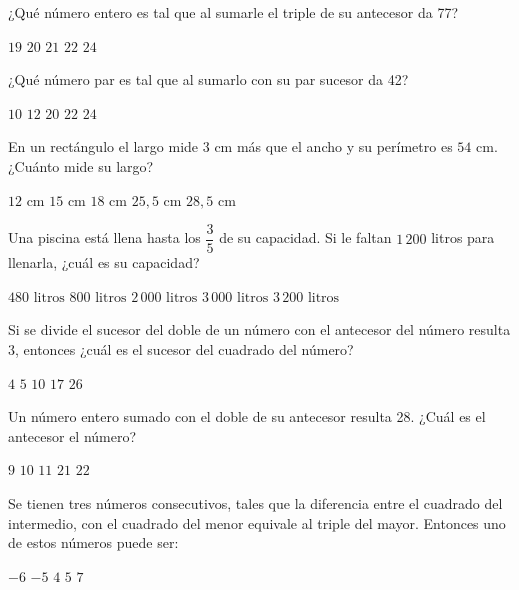 \documentclass[sin nombre]{srs}
\begin{document}
\separador

\begin{preguntas}[after-item-skip=2cm]
\pregunta ¿Qué número entero es tal que al sumarle el triple de su antecesor da 77?
\begin{vertical}
\alternativa $19$
\alternativa $20$
\alternativa $21$
\alternativa $22$
\alternativa $24$
\end{vertical}

\pregunta ¿Qué número par es tal que al sumarlo con su par sucesor da 42?
\begin{vertical}
\alternativa $10$
\alternativa $12$
\alternativa $20$
\alternativa $22$
\alternativa $24$
\end{vertical}

\pregunta En un rectángulo el largo mide $3 \text{ cm}$ más que el ancho y su perímetro es $54 \text{ cm}$. ¿Cuánto mide su largo?
\begin{vertical}
\alternativa $12 \text{ cm}$
\alternativa $15 \text{ cm}$
\alternativa $18 \text{ cm}$
\alternativa $25,5 \text{ cm}$
\alternativa $28,5 \text{ cm}$
\end{vertical}

\pregunta Una piscina está llena hasta los $\dfrac{3}{5}$ de su capacidad. Si le faltan $1\,200$ litros para llenarla, ¿cuál es su capacidad?
\begin{vertical}
\alternativa $480 \text{ litros}$
\alternativa $800 \text{ litros}$
\alternativa $2\,000 \text{ litros}$
\alternativa $3\,000 \text{ litros}$
\alternativa $3\,200 \text{ litros}$
\end{vertical}

\pregunta Si se divide el sucesor del doble de un número con el antecesor del número resulta $3$, entonces ¿cuál es el sucesor del cuadrado del número?
\begin{vertical}
\alternativa $4$
\alternativa $5$
\alternativa $10$
\alternativa $17$
\alternativa $26$
\end{vertical}

\pregunta Un número entero sumado con el doble de su antecesor resulta 28. ¿Cuál es el antecesor el número?
\begin{vertical}
\alternativa $9$
\alternativa $10$
\alternativa $11$
\alternativa $21$
\alternativa $22$
\end{vertical}

\pregunta Se tienen tres números consecutivos, tales que la diferencia entre el cuadrado del intermedio, con el cuadrado del menor equivale al triple del mayor. Entonces uno de estos números puede ser:
\begin{vertical}
\alternativa $-6$
\alternativa $-5$
\alternativa $4$
\alternativa $5$
\alternativa $7$
\end{vertical}


\end{preguntas}
\end{document}
